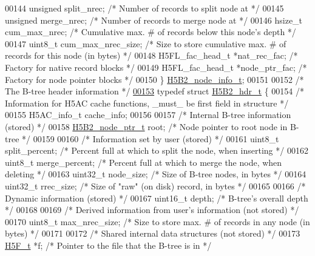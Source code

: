 \begin{DoxyCode}
{{00144     \textcolor{keywordtype}{unsigned}    split\_nrec;     \textcolor{comment}{/* Number of records to split node at */}
00145     \textcolor{keywordtype}{unsigned}    merge\_nrec;     \textcolor{comment}{/* Number of records to merge node at */}
00146     hsize\_t     cum\_max\_nrec;   \textcolor{comment}{/* Cumulative max. # of records below this node's depth */}
00147     uint8\_t     cum\_max\_nrec\_size; \textcolor{comment}{/* Size to store cumulative max. # of records for this node (in bytes) 
      */}
00148     H5FL\_fac\_head\_t *nat\_rec\_fac;   \textcolor{comment}{/* Factory for native record blocks */}
00149     H5FL\_fac\_head\_t *node\_ptr\_fac;  \textcolor{comment}{/* Factory for node pointer blocks */}
00150 \} \hyperlink{struct_h5_b2__node__info__t}{H5B2\_node\_info\_t};
00151 
00152 \textcolor{comment}{/* The B-tree header information */}
\hyperlink{struct_h5_b2__hdr__t}{00153} \textcolor{keyword}{typedef} \textcolor{keyword}{struct }\hyperlink{struct_h5_b2__hdr__t}{H5B2\_hdr\_t} \{
00154     \textcolor{comment}{/* Information for H5AC cache functions, \_must\_ be first field in structure */}
00155     H5AC\_info\_t cache\_info;
00156 
00157     \textcolor{comment}{/* Internal B-tree information (stored) */}
00158     \hyperlink{struct_h5_b2__node__ptr__t}{H5B2\_node\_ptr\_t} root;       \textcolor{comment}{/* Node pointer to root node in B-tree        */}
00159 
00160     \textcolor{comment}{/* Information set by user (stored) */}
00161     uint8\_t     split\_percent;  \textcolor{comment}{/* Percent full at which to split the node, when inserting */}
00162     uint8\_t     merge\_percent;  \textcolor{comment}{/* Percent full at which to merge the node, when deleting */}
00163     uint32\_t    node\_size;      \textcolor{comment}{/* Size of B-tree nodes, in bytes             */}
00164     uint32\_t    rrec\_size;      \textcolor{comment}{/* Size of "raw" (on disk) record, in bytes   */}
00165 
00166     \textcolor{comment}{/* Dynamic information (stored) */}
00167     uint16\_t    depth;      \textcolor{comment}{/* B-tree's overall depth                     */}
00168 
00169     \textcolor{comment}{/* Derived information from user's information (not stored) */}
00170     uint8\_t     max\_nrec\_size;  \textcolor{comment}{/* Size to store max. # of records in any node (in bytes) */}
00171 
00172     \textcolor{comment}{/* Shared internal data structures (not stored) */}
00173     \hyperlink{struct_h5_f__t}{H5F\_t}       *f;             \textcolor{comment}{/* Pointer to the file that the B-tree is in */}
}}
\end{DoxyCode}
